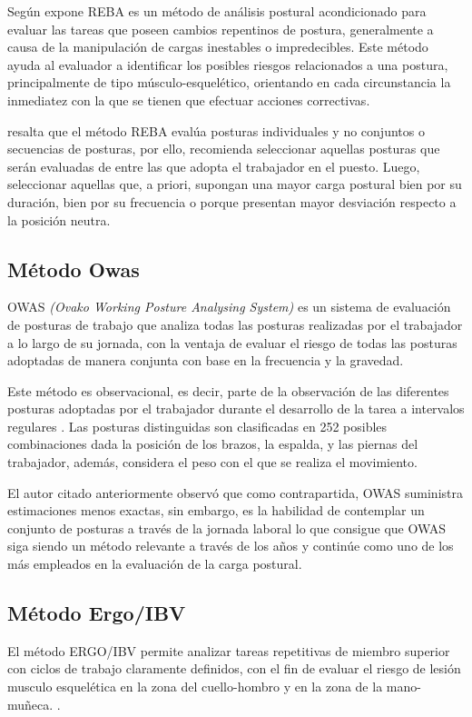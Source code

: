 Según expone \parencite{Hignett2000RapidREBA} REBA es un método de análisis postural acondicionado para evaluar las tareas que poseen cambios repentinos de postura, generalmente a causa de la manipulación de cargas inestables o impredecibles. Este método ayuda al evaluador a identificar los posibles riesgos relacionados a una postura, principalmente de tipo músculo-esquelético, orientando en cada circunstancia la inmediatez con la que se tienen que efectuar acciones correctivas.

\parencite{Diego-Mas2015EvaluacionREBA} resalta que el método REBA evalúa posturas individuales y no conjuntos o secuencias de posturas, por ello, recomienda seleccionar aquellas posturas que serán evaluadas de entre las que adopta el trabajador en el puesto. Luego, seleccionar aquellas que, a priori, supongan una mayor carga postural bien por su duración, bien por su frecuencia o porque presentan mayor desviación respecto a la posición neutra.
\subsection{Método Owas}
OWAS \textit{(Ovako Working Posture Analysing System)} es un sistema de evaluación de posturas de trabajo que analiza todas las posturas realizadas por el trabajador a lo largo de su jornada, con la ventaja de evaluar el riesgo de todas las posturas adoptadas de manera conjunta con base en la frecuencia y la gravedad. \parencite{MattilaMVilkki1999OccupationalSystems}

Este método es observacional, es decir, parte de la observación de las diferentes posturas adoptadas por el trabajador durante el desarrollo de la tarea a intervalos regulares \parencite{Diego-Mas2015EvaluacionOWAS}. Las posturas distinguidas son clasificadas en 252 posibles combinaciones dada la posición de los brazos, la espalda, y las piernas del trabajador, además, considera el peso con el que se realiza el movimiento. 

El autor citado anteriormente observó que como contrapartida, OWAS suministra estimaciones menos exactas, sin embargo, es la habilidad de contemplar un conjunto de posturas a través de la jornada laboral lo que consigue que OWAS siga siendo un método relevante a través de los años y continúe como uno de los más empleados en la evaluación de la carga postural.
\subsection{Método Ergo/IBV}
El método ERGO/IBV permite analizar tareas repetitivas de miembro superior con ciclos de trabajo claramente definidos, con el fin de evaluar el riesgo de lesión musculo esquelética en la zona del cuello-hombro y en la zona de la mano-muñeca. \parencite{Nogareda2009TareasErgonomicos}.

